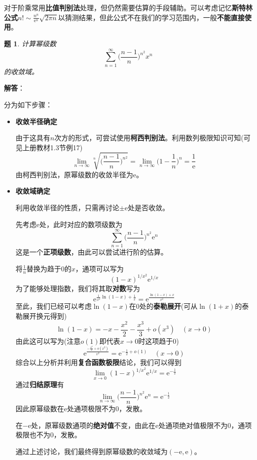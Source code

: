 \documentclass[a4paper,UTF8,fontset=windows,AutoFakeBold]{ctexart}
\newcommand*{\er}{\mathrm{e}}
\newcommand*{\suminf}[1][n=1]{\sum_{#1}^\infty}
\newcommand*{\note}{\noindent *}
\theoremstyle{ex}
\newtheorem{exercise}{题}
\newcommand{\sol}[1]{{\vspace{5pt}\kaishu\noindent\textbf{解答}：\vspace{-3pt}
\begin{compactitem}
    \item[] #1
\end{compactitem}
}}
\begin{document}
\note 对于阶乘常用\textbf{比值判别法}处理，但仍然需要估算的手段辅助。可以考虑记忆\textbf{斯特林公式}$n!\sim\frac{n^n}{\er^n}\sqrt{2\pi n}$以猜测结果，但此公式不在我们的学习范围内，一般\textbf{不能直接使用}。

\begin{framed}
\begin{exercise}
    计算幂级数
    $$\suminf\bigg(\frac{n-1}{n}\bigg)^{n^2}x^n$$
    的收敛域。
\end{exercise}
\sol{
    分为如下步骤：
    \begin{itemize}
        \item \textbf{收敛半径确定}
        
        由于这具有$n$次方的形式，可尝试使用\textbf{柯西判别法}。利用数列极限知识可知(可见上册教材1.3节例17)
        $$\lim_{n\to\infty}\sqrt[n]{\bigg(\frac{n-1}{n}\bigg)^{n^2}}=\lim_{n\to\infty}\bigg(1-\frac{1}{n}\bigg)^n=\frac{1}{\er}$$
        由柯西判别法，原幂级数的收敛半径为$\er$。
        
        \item \textbf{收敛域确定}
        
        利用收敛半径的性质，只需再讨论$\pm\er$处是否收敛。

        先考虑$\er$处，此时对应的数项级数为
        $$\suminf\bigg(\frac{n-1}{n}\bigg)^{n^2}\er^n$$
        这是一个\textbf{正项级数}，由此可以尝试进行阶的估算。

        将$\frac{1}{n}$替换为趋于0的$x$，通项可以写为
        $$(1-x)^{1/x^2}\er^{1/x}$$
        为了能够处理指数，我们将其取\textbf{对数}写为
        $$\er^{\frac{1}{x^2}\ln(1-x)+\frac{1}{x}}=\er^{\frac{\ln(1-x)+x}{x^2}}$$
        至此，我们已经可以考虑$\ln(1-x)$在0处的\textbf{泰勒展开}(可从$\ln(1+x)$的泰勒展开换元得到)
        $$\ln(1-x)=-x-\frac{x^2}{2}-\frac{x^3}{3}+o(x^3)\quad(x\to0)$$
        由此这可以写为(注意$o(1)$即代表$x\to0$时这项趋于0)
        $$\er^{\frac{-\frac{x^2}{2}+o(x^2)}{x^2}}=\er^{-\frac{1}{2}+o(1)}\quad(x\to0)$$
        综合以上分析并利用\textbf{复合函数极限}结论，我们可以得到
        $$\lim_{x\to0}(1-x)^{1/x^2}\er^{1/x}=\er^{-\frac{1}{2}}$$
        通过\textbf{归结原理}有
        $$\lim_{n\to\infty}\bigg(\frac{n-1}{n}\bigg)^{n^2}\er^n=\er^{-\frac{1}{2}}$$
        因此原幂级数在$\er$处通项极限不为0，发散。

        在$-\er$处，原幂级数通项的\textbf{绝对值}不变，由此在$\er$处通项绝对值极限不为0，通项极限也不为0，发散。

        通过上述讨论，我们最终得到原幂级数的收敛域为$(-\er,\er)$。
    \end{itemize}
}
\end{framed}
\end{document}
